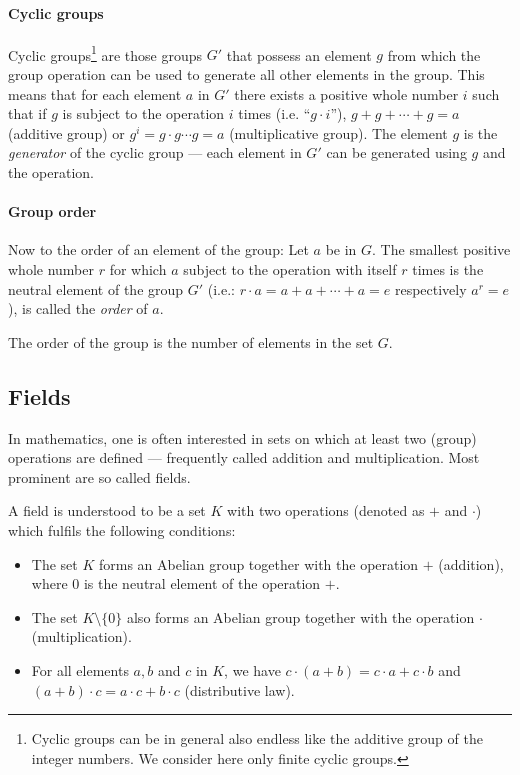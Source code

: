 \paragraph{Cyclic groups}
Cyclic groups\footnote{Cyclic groups can be in general also endless like the additive group of the integer numbers. We consider here only finite cyclic groups.} are those groups $G'$ that possess an element $g$
from which the group operation can be used to generate all other
elements in the group. This means that for each element $a$ in
$G'$ there exists a positive whole number $i$ such that if $g$ is
subject to the operation $i$ times (i.e. ``$g\cdot i$''),
$g+g+\cdots+g = a$ (additive group) or $g^i = g\cdot g \cdots g = a$
(multiplicative group). The element $g$ is the {\em generator} of
the cyclic group --- each element in $G'$ can be generated using
$g$ and the operation.

\paragraph{Group order}
Now to the order of an element of the group: Let $a$ be in $G$. The smallest
positive whole number $r$ for which $a$ subject to the operation with itself $r$
times is the neutral element of the group $G'$ (i.e.: $r \cdot a = a+a+\cdots+a =
e$ respectively $a^r = e$), is called the {\em order} of $a$.

The order of the group is the number of elements in the set $G$.

\subsection{Fields}

In mathematics, one is often interested in sets on which at least two (group) operations are defined --- frequently called addition and multiplication. Most prominent are so called fields.

A field is understood to be a set $K$ with two operations
(denoted as $+$ and $\cdot$) which fulfils the following conditions:
\begin{itemize}
   \item The set $K$ forms an Abelian group together with the operation $+$
(addition), where $0$ is the neutral element of the operation $+$.
   \item The set $K\setminus\{ 0\}$ also forms an Abelian group
together with the operation $\cdot$ (multiplication).
   \item For all elements $a, b$ and $c$ in $K$, we have $c\cdot (a+b) = c \cdot a + c
\cdot b$ and $(a+b) \cdot c = a \cdot c + b \cdot c$ (distributive law).
\end{itemize}

